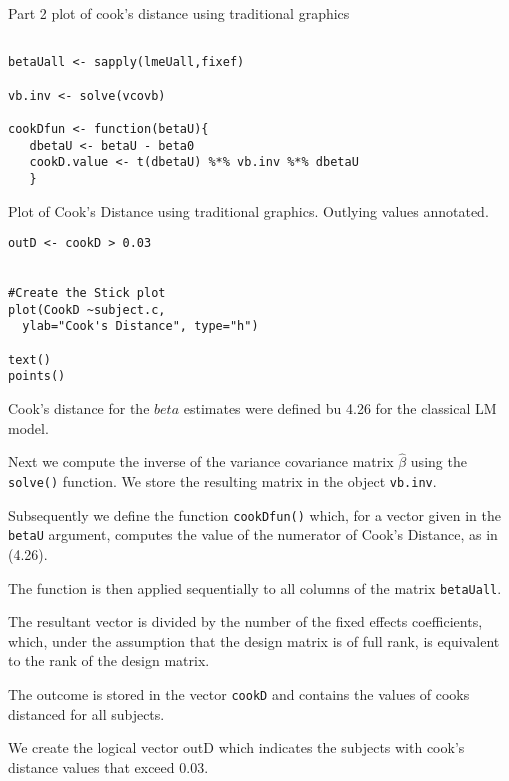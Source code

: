 \documentclass[a4paper,12pt]{article}
\begin{document}
Part 2 plot of cook's distance using traditional graphics


\begin{framed}
\begin{verbatim}

betaUall <- sapply(lmeUall,fixef)

vb.inv <- solve(vcovb)

cookDfun <- function(betaU){
   dbetaU <- betaU - beta0
   cookD.value <- t(dbetaU) %*% vb.inv %*% dbetaU
   }
\end{verbatim}
\end{framed}

Plot of Cook's Distance using traditional graphics. 
Outlying values annotated.

\begin{framed}
\begin{verbatim}
outD <- cookD > 0.03


#Create the Stick plot
plot(CookD ~subject.c, 
  ylab="Cook's Distance", type="h")

text()
points()
\end{verbatim}
\end{framed}

Cook's distance for the $beta$ estimates were defined bu 4.26 for the classical LM model.


Next we compute the inverse of the variance covariance matrix $\hat{\beta}$ using the \texttt{solve()} function.
We store the resulting matrix in the object \texttt{vb.inv}.

Subsequently we define the function \texttt{cookDfun()} which, for a vector given in
the \texttt{betaU} argument, computes the value of the numerator of Cook's Distance, as in (4.26).

The function is then applied sequentially to all columns of the matrix \texttt{betaUall}.


The resultant vector is divided by the number of the fixed effects coefficients, which, under the assumption that the design matrix is of full rank, 
is equivalent to the rank of the design matrix.



The outcome is stored in the vector \texttt{cookD} and contains the values of cooks distanced for all subjects.

We create the logical vector outD which indicates the subjects with cook's distance values that exceed 0.03.
\end{document}
